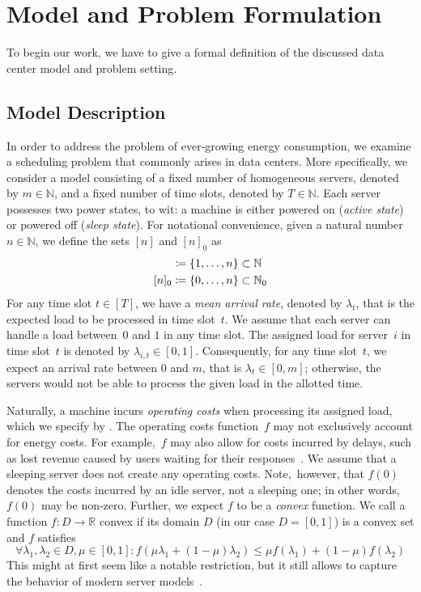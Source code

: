
\chapter{Model and Problem Formulation}
To begin our work, we have to give a formal definition of the discussed data center model and problem setting.

\section{Model Description}\label{sec:model_descr}
In order to address the problem of ever-growing energy consumption, we examine a scheduling problem that commonly arises in data centers. More specifically, we consider a model consisting of a fixed number of homogeneous servers, denoted by $m\in\mathbb{N}$, and a fixed number of time slots, denoted by $T\in\mathbb{N}$. Each server possesses two power states, to wit: a machine is either powered on (\emph{active state}) or powered off (\emph{sleep state}). For notational convenience, given a natural number $n\in\mathbb{N}$, we define the sets $[n]$ and $[n]_0$ as
\begin{align*}
	[n]&\coloneqq\fromto{1}{n}\subset\mathbb{N}\\
	[n]_0&\coloneqq\fromto{0}{n}\subset\mathbb{N}_0
\end{align*}
For any time slot $t\in[T]$, we have a \emph{mean arrival rate}, denoted by $\lambda_t$, that is the expected load to be processed in time slot~$t$. We assume that each server can handle a load between~$0$ and $1$ in any time slot. The assigned load for server~$i$ in time slot~$t$ is denoted by $\lambda_{i,t}\in[0,1]$. Consequently, for any time slot~$t$, we expect an arrival rate between $0$ and $m$, that is $\lambda_t\in[0,m]$; otherwise, the servers would not be able to process the given load in the allotted time.

Naturally, a machine incurs \emph{operating costs} when processing its assigned load, which we specify by . The operating costs function~$f$ may not exclusively account for energy costs. For example,~$f$ may also allow for costs incurred by delays, such as lost revenue caused by users waiting for their responses~\parencite{dyn-right-sizing}\parencite{geo-load-balancing}. We assume that a sleeping server does not create any operating costs. Note,~however, that $f(0)$ denotes the costs incurred by an idle server, not a sleeping one; in other words, $f(0)$ may be non-zero. Further, we expect $f$ to be a \emph{convex} function. We call a function $f:D\rightarrow\mathbb{R}$ convex if its domain $D$ (in our case $D=[0,1]$) is a convex set and $f$ satisfies
\begin{equation}\label{eq:convex_condition}
	\forall \lambda_1,\lambda_2\in D,\mu\in[0,1]:f(\mu\lambda_1+(1-\mu)\lambda_2)\le\mu f(\lambda_1)+(1-\mu)f(\lambda_2)
\end{equation}
This might at first seem like a notable restriction, but it still allows to capture the behavior of modern server models~\parencite{bansal-soco}\parencite{dyn-right-sizing}.

